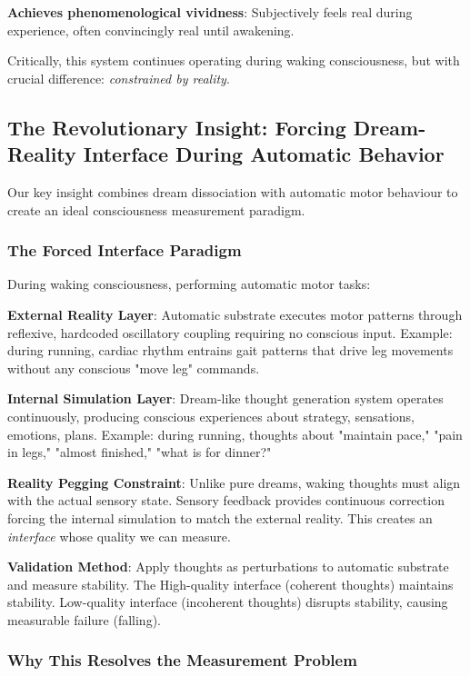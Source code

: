 \documentclass[11pt,onecolumn]{article}
\begin{document}
\textbf{Achieves phenomenological vividness}: Subjectively feels real during experience, often convincingly real until awakening.

Critically, this system continues operating during waking consciousness, but with crucial difference: \textit{constrained by reality}.

\subsection{The Revolutionary Insight: Forcing Dream-Reality Interface During Automatic Behavior}

Our key insight combines dream dissociation with automatic motor behaviour to create an ideal consciousness measurement paradigm.

\subsubsection{The Forced Interface Paradigm}

During waking consciousness, performing automatic motor tasks:

\textbf{External Reality Layer}: Automatic substrate executes motor patterns through reflexive, hardcoded oscillatory coupling requiring no conscious input. Example: during running, cardiac rhythm entrains gait patterns that drive leg movements without any conscious "move leg" commands.

\textbf{Internal Simulation Layer}: Dream-like thought generation system operates continuously, producing conscious experiences about strategy, sensations, emotions, plans. Example: during running, thoughts about "maintain pace," "pain in legs," "almost finished," "what is for dinner?"

\textbf{Reality Pegging Constraint}: Unlike pure dreams, waking thoughts must align with the actual sensory state. Sensory feedback provides continuous correction forcing the internal simulation to match the external reality. This creates an \textit{interface} whose quality we can measure.

\textbf{Validation Method}: Apply thoughts as perturbations to automatic substrate and measure stability. The High-quality interface (coherent thoughts) maintains stability. Low-quality interface (incoherent thoughts) disrupts stability, causing measurable failure (falling).

\subsubsection{Why This Resolves the Measurement Problem}
\end{document}
